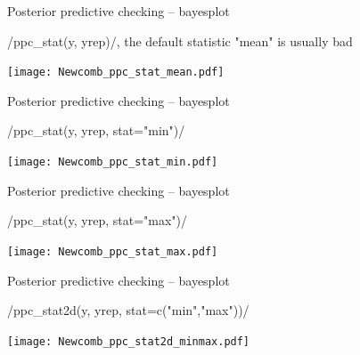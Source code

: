\documentclass[t]{beamer}
\begin{document}
\begin{frame}{Posterior predictive checking -- bayesplot}

  \vspace{-1\baselineskip}
  \rinline/ppc_stat(y, yrep)/, the default statistic "mean" is usually bad
  
  \texttt{[image: Newcomb\_ppc\_stat\_mean.pdf]}

\end{frame}

\begin{frame}{Posterior predictive checking -- bayesplot}

  \vspace{-1\baselineskip}
  \rinline/ppc_stat(y, yrep, stat="min")/
  
  \texttt{[image: Newcomb\_ppc\_stat\_min.pdf]}

\end{frame}

\begin{frame}{Posterior predictive checking -- bayesplot}

  \vspace{-1\baselineskip}
  \rinline/ppc_stat(y, yrep, stat="max")/
  
  \texttt{[image: Newcomb\_ppc\_stat\_max.pdf]}

\end{frame}

\begin{frame}{Posterior predictive checking -- bayesplot}

  \vspace{-1\baselineskip}
  \rinline/ppc_stat2d(y, yrep, stat=c("min","max"))/
  
  \texttt{[image: Newcomb\_ppc\_stat2d\_minmax.pdf]}

\end{frame}



\end{document}
